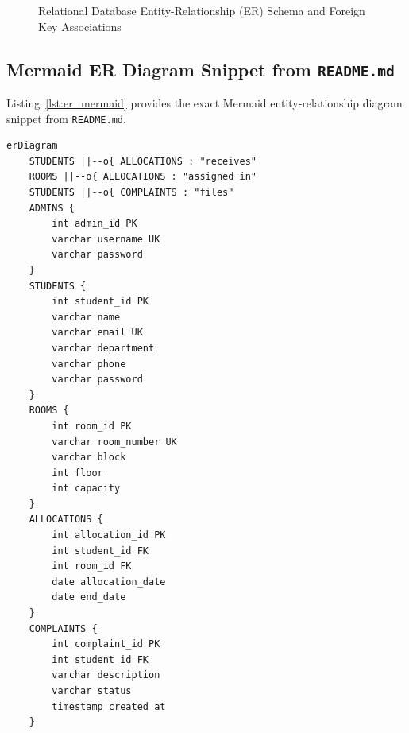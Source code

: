 \documentclass[12pt,a4paper]{article}
\begin{document}
\begin{figure}[H]
{
}
\caption{Relational Database Entity-Relationship (ER) Schema and Foreign Key Associations}
\label{fig:er_schema}
\end{figure}

\subsection{Mermaid ER Diagram Snippet from \texttt{README.md}}
\label{sec:er_mermaid}
Listing~\ref{lst:er_mermaid} provides the exact Mermaid entity-relationship diagram snippet from \texttt{README.md}.

\begin{lstlisting}[style=mermaidstyle, caption={Mermaid Entity-Relationship (ER) Diagram Snippet from \texttt{README.md}}, label={lst:er_mermaid}]
erDiagram
    STUDENTS ||--o{ ALLOCATIONS : "receives"
    ROOMS ||--o{ ALLOCATIONS : "assigned in"
    STUDENTS ||--o{ COMPLAINTS : "files"
    ADMINS {
        int admin_id PK
        varchar username UK
        varchar password
    }
    STUDENTS {
        int student_id PK
        varchar name
        varchar email UK
        varchar department
        varchar phone
        varchar password
    }
    ROOMS {
        int room_id PK
        varchar room_number UK
        varchar block
        int floor
        int capacity
    }
    ALLOCATIONS {
        int allocation_id PK
        int student_id FK
        int room_id FK
        date allocation_date
        date end_date
    }
    COMPLAINTS {
        int complaint_id PK
        int student_id FK
        varchar description
        varchar status
        timestamp created_at
    }
\end{lstlisting}
\end{document}
